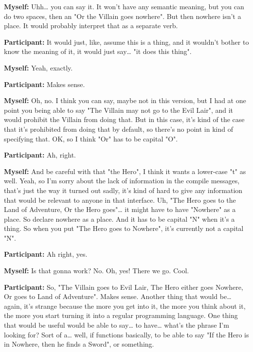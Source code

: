 \documentclass[11pt]{report}
\begin{document}
\begin{linenumbers}
\textbf{Myself:} Uhh\ldots{} you can say it. It won't have any semantic meaning, but you can do two spaces, then an "Or the Villain goes nowhere". But then nowhere isn't a place. It would probably interpret that as a separate verb.

\textbf{Participant:} It would just, like, assume this is a thing, and it wouldn't bother to know the meaning of it, it would just say\ldots{} "it does this thing".

\textbf{Myself:} Yeah, exactly.

\textbf{Participant:} Makes sense.

\textbf{Myself:} Oh, no. I think you can say, maybe not in this version, but I had at one point you being able to say "The Villain may not go to the Evil Lair", and it would prohibit the Villain from doing that. But in this case, it's kind of the case that it's prohibited from doing that by default, so there's no point in kind of specifying that. OK, so I think "Or" has to be capital "O".

\textbf{Participant:} Ah, right.

\textbf{Myself:} And be careful with that "the Hero", I think it wants a lower-case "t" as well. Yeah, so I'm sorry about the lack of information in the compile messages, that's just the way it turned out sadly, it's kind of hard to give any information that would be relevant to anyone in that interface. Uh, "The Hero goes to the Land of Adventure, Or the Hero goes"\ldots{} it might have to have "Nowhere" as a place. So declare nowhere as a place. And it has to be capital "N" when it's a thing. So when you put "The Hero goes to Nowhere", it's currently not a capital "N".

\textbf{Participant:} Ah right, yes.

\textbf{Myself:} Is that gonna work? No. Oh, yes! There we go. Cool.

\textbf{Participant:} So, "The Villain goes to Evil Lair, The Hero either goes Nowhere, Or goes to Land of Adventure". Makes sense. Another thing that would be\ldots{} again, it's strange because the more you get into it, the more you think about it, the more you start turning it into a regular programming language. One thing that would be useful would be able to say\ldots{} to have\ldots{} what's the phrase I'm looking for? Sort of a\ldots{} well, if functions basically, to be able to say "If the Hero is in Nowhere, then he finds a Sword", or something.


\end{linenumbers}
\end{document}
